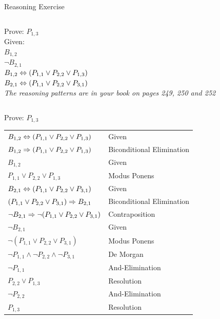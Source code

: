 \documentclass[14pt]{beamer}
\begin{document}
\begin{frame}[label=reasoning-exercise]{Reasoning Exercise}
\begin{columns}
\begin{column}{0.45\textwidth}
Prove: $P_{1, 3}$ \\
\bigskip
Given: \\[.2em]
$B_{1, 2}$ \\
$\lnot B_{2, 1}$ \\
$B_{1, 2} \Leftrightarrow (P_{1, 1} \lor P_{2, 2} \lor P_{1, 3})$ \\
$B_{2, 1} \Leftrightarrow (P_{1, 1} \lor P_{2, 2} \lor P_{3, 1})$ \\
\bigskip
\bigskip
\footnotesize\em
The reasoning patterns are in your book on pages 249, 250 and 252
\end{column}
\begin{column}{0.45\textwidth}
\begin{wumpusgrid}{3}{0.2\textheight}
\end{wumpusgrid}
\end{column}
\end{columns}
\end{frame}

\begin{frame}{Prove: $P_{1, 3}$}
\small
\begin{tabular}{ll}
$B_{1, 2} \Leftrightarrow (P_{1, 1} \lor P_{2, 2} \lor P_{1, 3})$ & Given \\
$B_{1, 2} \Rightarrow (P_{1, 1} \lor P_{2, 2} \lor P_{1, 3})$ & Biconditional Elimination \\
$B_{1, 2}$ & Given \\
$P_{1, 1} \lor P_{2, 2} \lor P_{1, 3}$ & Modus Ponens \\
\hline
$B_{2, 1} \Leftrightarrow (P_{1, 1} \lor P_{2, 2} \lor P_{3, 1})$ & Given \\
$(P_{1, 1} \lor P_{2, 2} \lor P_{3, 1}) \Rightarrow B_{2, 1}$ & Biconditional Elimination \\
$\lnot B_{2, 1} \Rightarrow \lnot(P_{1, 1} \lor P_{2, 2} \lor P_{3, 1})$ & Contraposition \\
$\lnot B_{2, 1}$ & Given \\
$\lnot(P_{1, 1} \lor P_{2, 2} \lor P_{3, 1})$ & Modus Ponens \\
$\lnot P_{1, 1} \land \lnot P_{2, 2} \land \lnot P_{3, 1}$ & De Morgan \\
\hline
$\lnot P_{1, 1}$ & And-Elimination \\
$P_{2, 2} \lor P_{1, 3}$ & Resolution \\
$\lnot P_{2, 2}$ & And-Elimination \\
$P_{1, 3}$ & Resolution \\
\end{tabular}
\end{frame}
\end{document}
